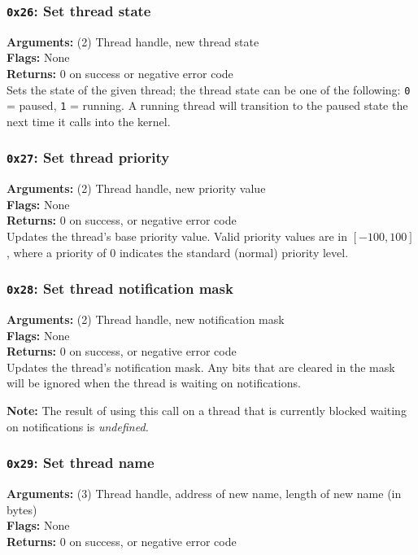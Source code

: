 \documentclass[11pt]{article}
\begin{document}
\subsubsection{{\tt 0x26}: Set thread state}
\textbf{Arguments:} (2) Thread handle, new thread state \\
\textbf{Flags:} None \\
\textbf{Returns:} 0 on success or negative error code \\

Sets the state of the given thread; the thread state can be one of the following: \texttt{0} = paused, \texttt{1} = running. A running thread will transition to the paused state the next time it calls into the kernel.

\subsubsection{{\tt 0x27}: Set thread priority}
\textbf{Arguments:} (2) Thread handle, new priority value \\
\textbf{Flags:} None \\
\textbf{Returns:} 0 on success, or negative error code \\

Updates the thread's base priority value. Valid priority values are in $[-100, 100]$, where a priority of $0$ indicates the standard (normal) priority level.

\subsubsection{{\tt 0x28}: Set thread notification mask}
\textbf{Arguments:} (2) Thread handle, new notification mask \\
\textbf{Flags:} None \\
\textbf{Returns:} 0 on success, or negative error code \\

Updates the thread's notification mask. Any bits that are cleared in the mask will be ignored when the thread is waiting on notifications.

\textbf{Note:} The result of using this call on a thread that is currently blocked waiting on notifications is \textit{undefined.}

\subsubsection{{\tt 0x29}: Set thread name}
\textbf{Arguments:} (3) Thread handle, address of new name, length of new name (in bytes) \\
\textbf{Flags:} None \\
\textbf{Returns:} 0 on success, or negative error code \\
\end{document}
